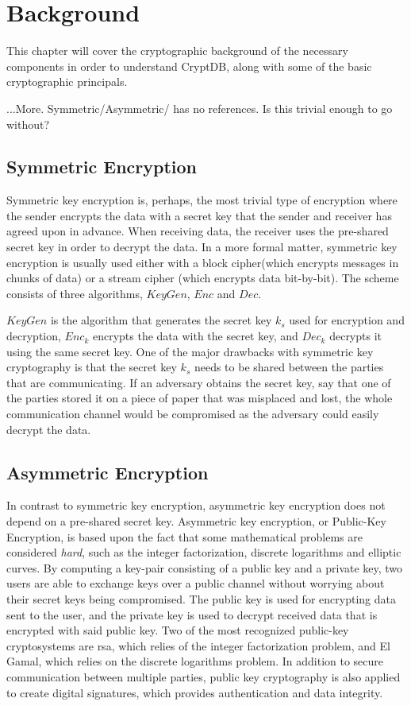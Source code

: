 \chapter{Background}
\label{chp:background}

This chapter will cover the cryptographic background of the necessary components in order to understand CryptDB, along with some of the basic cryptographic principals.

...More. Symmetric/Asymmetric/ has no references. Is this trivial enough to go without?

\section{Symmetric Encryption}

Symmetric key encryption is, perhaps, the most trivial type of encryption where the sender encrypts the data with a secret key that the sender and receiver has agreed upon in advance. When receiving data, the receiver uses the pre-shared secret key in order to decrypt the data. In a more formal matter, symmetric key encryption is usually used either with a block cipher(which encrypts messages in chunks of data) or a stream cipher (which encrypts data bit-by-bit). The scheme consists of three algorithms, $KeyGen$, $Enc$ and $Dec$.

$KeyGen$ is the algorithm that generates the secret key $k_s$ used for encryption and decryption, $Enc_k$ encrypts the data with the secret key, and $Dec_k$ decrypts it using the same secret key. One of the major drawbacks with symmetric key cryptography is that the secret key $k_s$ needs to be shared between the parties that are communicating. If an adversary obtains the secret key, say that one of the parties stored it on a piece of paper that was misplaced and lost, the whole communication channel would be compromised as the adversary could easily decrypt the data.

\section{Asymmetric Encryption}

In contrast to symmetric key encryption, asymmetric key encryption does not depend on a pre-shared secret key. Asymmetric key encryption, or Public-Key Encryption, is based upon the fact that some mathematical problems are considered \emph{hard}, such as the integer factorization, discrete logarithms and elliptic curves. By computing a key-pair consisting of a public key and a private key, two users are able to exchange keys over a public channel without worrying about their secret keys being compromised. The public key is used for encrypting data sent to the user, and the private key is used to decrypt received data that is encrypted with said public key. Two of the most recognized public-key cryptosystems are \gls{rsa}, which relies of the integer factorization problem, and El Gamal, which relies on the discrete logarithms problem. In addition to secure communication between multiple parties, public key cryptography is also applied to create digital signatures, which provides authentication and data integrity.

